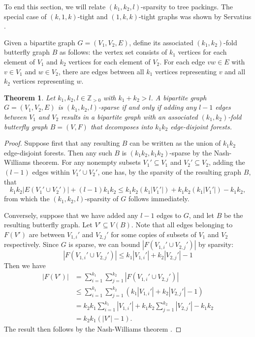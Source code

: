 \documentclass[10pt,a4paper]{article}
\newtheorem{theorem}{Theorem}
\begin{document}
To end this section, we will relate
$(k_1,k_2,l)$-sparsity to tree packings. The special case of $(k,1,k)$-tight and $(1,k,k)$-tight graphs was shown by Servatius \cite{k-planematroids}. 

Given a bipartite graph $G=(V_1,V_2,E)$, define its associated $(k_1,k_2)$-fold butterfly graph $B$ as follows: the vertex set consists of $k_1$ vertices for each element of $V_1$ and $k_2$ vertices for each element of $V_2$. For each edge $vw \in E$ with $v\in V_1$ and $w\in V_2$, there are edges between all $k_1$ vertices representing $v$ and all $k_2$ vertices representing $w$. 

\begin{theorem}
    Let $k_1, k_2, l\in \mathbb{Z}_{>0}$ with $k_1+k_2 >l$. A bipartite graph $G=(V_1,V_2,E)$ is $(k_1,k_2,l)$-sparse if and only if adding any $l-1$ edges between $V_1$ and $V_2$ results in a bipartite graph with an associated $(k_1,k_2)$-fold butterfly graph $B=(V, F)$ that decomposes into $k_1k_2$ edge-disjoint forests.
    \label{arboricity}
\end{theorem}

\begin{proof}
Suppose first that any resulting $B$ can be written as the union of $k_1k_2$ edge-disjoint forests. Then any such $B$ is $(k_1k_2, k_1k_2)$-sparse by the Nash-Williams theorem. For any nonempty subsets $V_1' \subseteq V_1$ and $V_2'\subseteq V_2$, adding the $(l-1)$ edges within $V_1' \cup V_2'$, one has, by the sparsity of the resulting graph $B$, that $$k_1k_2| E(V_1' \cup V_2')|+ (l -1)k_1k_2 \leq k_1k_2(k_1| V_1'|) + k_1k_2(k_1| V_1'|) - k_1k_2,$$ from which the $(k_1, k_2, l)$-sparsity of $G$ follows immediately.

 Conversely, suppose that we have added any $l-1$ edges to $G$, and let $B$ be the resulting butterfly graph. Let $V'\subseteq V(B)$. Note that all edges belonging to $F(V')$ are between $V_{1, i}'$ and $V_{2, j}'$ for some copies of subsets of $V_1$ and $V_2$ respectively. Since $G$ is sparse, we can bound $|F(V_{1, i}'\cup  V_{2, j}')|$ by sparsity:
    \begin{equation*}
        |F(V_{1, i}'\cup  V_{2, j}')| \leq k_1 |V_{1, i}'| + k_2 |V_{2, j}'| - 1
    \end{equation*}
    Then we have
    \begin{align*}
        |F(V')| &= \sum_{i=1}^{k_1} \sum_{j=1}^{k_2} |F(V_{1, i}'\cup  V_{2, j}')|\\
        &\leq  \sum_{i=1}^{k_1} \sum_{j=1}^{k_2}\left( k_1 |V_{1, i}'| + k_2 |V_{2, j}'| - 1\right)\\
        &=  k_2 k_1 \sum_{i=1}^{k_1} |V_{1, i}'| + k_1 k_2 \sum_{j=1}^{k_2} |V_{2, j}'| - k_1 k_2\\
        &=  k_2 k_1 (|V'| - 1).
    \end{align*}
    The result then follows by the Nash-Williams theorem \cite{Nash-Williams}. 
\end{proof}
\end{document}

